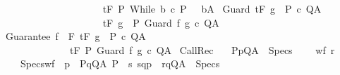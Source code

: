\begin{isabellebody}
\ \ \ \ \ \ \ \ \ \ {\isasymLongrightarrow}\isanewline
\ \ \ \ \ \ \ \ \ \ {\isasymGamma}{\isacharcomma}{\isasymTheta}{\isasymturnstile}\isactrlsub t\isactrlbsub {\isacharslash}F\isactrlesub \ P\ {\isacharparenleft}While\ b\ c{\isacharparenright}\ {\isacharparenleft}P\ {\isasyminter}\ {\isacharminus}\ b{\isacharparenright}{\isacharcomma}A{\isachardoublequoteclose}\isanewline
\isanewline
{\isacharbar}\ Guard{\isacharcolon}\ {\isachardoublequoteopen}{\isasymGamma}{\isacharcomma}{\isasymTheta}{\isasymturnstile}\isactrlsub t\isactrlbsub {\isacharslash}F\isactrlesub \ {\isacharparenleft}g\ {\isasyminter}\ P{\isacharparenright}\ c\ Q{\isacharcomma}A\isanewline
\ \ \ \ \ \ \ \ \ \ {\isasymLongrightarrow}\isanewline
\ \ \ \ \ \ \ \ \ \ {\isasymGamma}{\isacharcomma}{\isasymTheta}{\isasymturnstile}\isactrlsub t\isactrlbsub {\isacharslash}F\isactrlesub \ {\isacharparenleft}g\ {\isasyminter}\ P{\isacharparenright}\ Guard\ f\ g\ c\ Q{\isacharcomma}A{\isachardoublequoteclose}\isanewline
\isanewline
{\isacharbar}\ Guarantee{\isacharcolon}\ {\isachardoublequoteopen}{\isasymlbrakk}f\ {\isasymin}\ F{\isacharsemicolon}\ {\isasymGamma}{\isacharcomma}{\isasymTheta}{\isasymturnstile}\isactrlsub t\isactrlbsub {\isacharslash}F\isactrlesub \ {\isacharparenleft}g\ {\isasyminter}\ P{\isacharparenright}\ c\ Q{\isacharcomma}A{\isasymrbrakk}\isanewline
\ \ \ \ \ \ \ \ \ \ \ \ \ \ {\isasymLongrightarrow}\isanewline
\ \ \ \ \ \ \ \ \ \ \ \ \ \ {\isasymGamma}{\isacharcomma}{\isasymTheta}{\isasymturnstile}\isactrlsub t\isactrlbsub {\isacharslash}F\isactrlesub \ P\ {\isacharparenleft}Guard\ f\ g\ c{\isacharparenright}\ Q{\isacharcomma}A{\isachardoublequoteclose}\isanewline
\isanewline
{\isacharbar}\ CallRec{\isacharcolon}\ \isanewline
\ \ {\isachardoublequoteopen}{\isasymlbrakk}{\isacharparenleft}P{\isacharcomma}p{\isacharcomma}Q{\isacharcomma}A{\isacharparenright}\ {\isasymin}\ Specs{\isacharsemicolon}\isanewline
\ \ \ \ wf\ r{\isacharsemicolon}\ \isanewline
\ \ \ \ Specs{\isacharunderscore}wf\ {\isacharequal}\ {\isacharparenleft}{\isasymlambda}p\ {\isasymsigma}{\isachardot}\ {\isacharparenleft}{\isasymlambda}{\isacharparenleft}P{\isacharcomma}q{\isacharcomma}Q{\isacharcomma}A{\isacharparenright}{\isachardot}\ {\isacharparenleft}P\ {\isasyminter}\ {\isacharbraceleft}s{\isachardot}\ {\isacharparenleft}{\isacharparenleft}s{\isacharcomma}q{\isacharparenright}{\isacharcomma}{\isacharparenleft}{\isasymsigma}{\isacharcomma}p{\isacharparenright}{\isacharparenright}\ {\isasymin}\ r{\isacharbraceright}{\isacharcomma}q{\isacharcomma}Q{\isacharcomma}A{\isacharparenright}{\isacharparenright}\ {\isacharbackquote}\ Specs{\isacharparenright}{\isacharsemicolon}\isanewline

\end{isabellebody}
